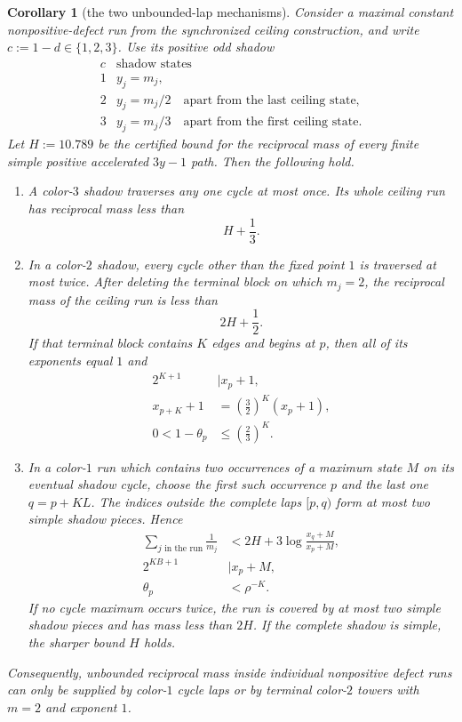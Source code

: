 \documentclass[11pt]{article}
\newtheorem{corollary}[theorem]{Corollary}
\begin{document}
\begin{corollary}[the two unbounded-lap mechanisms]
Consider a maximal constant nonpositive-defect run from the synchronized
ceiling construction, and write $c:=1-d\in\{1,2,3\}$.  Use its positive
odd shadow
\[
\begin{array}{c|c}
  c&\text{shadow states}\ \\ \hline
  1&y_j=m_j,\\
  2&y_j=m_j/2\quad\text{apart from the last ceiling state},\\
  3&y_j=m_j/3\quad\text{apart from the first ceiling state}.
\end{array}
\tag{26}
\]
Let $H:=10.789$ be the certified bound for the reciprocal mass of every
finite simple positive accelerated $3y-1$ path.  Then the following hold.

\begin{enumerate}
  \item A color-$3$ shadow traverses any one cycle at most once.  Its whole
  ceiling run has reciprocal mass less than
  \[
    H+\frac13.
    \tag{27}
  \]

  \item In a color-$2$ shadow, every cycle other than the fixed point $1$
  is traversed at most twice.  After deleting the terminal block on which
  $m_j=2$, the reciprocal mass of the ceiling run is less than
  \[
    2H+\frac12.
    \tag{28}
  \]
  If that terminal block contains $K$ edges and begins at $p$, then all of
  its exponents equal $1$ and
  \[
  \boxed{\begin{aligned}
    2^{K+1}&\mid x_p+1,\\
    x_{p+K}+1&=\left(\frac32\right)^K(x_p+1),\\
    0<1-\theta_p&\leq\left(\frac23\right)^K.
  \end{aligned}}
  \tag{29}
  \]

  \item In a color-$1$ run which contains two occurrences of a maximum
  state $M$ on its eventual shadow cycle, choose the first such occurrence
  $p$ and the last one $q=p+KL$.  The indices outside the complete laps
  $[p,q)$ form at most two simple shadow pieces.  Hence
  \[
  \boxed{\begin{aligned}
    \sum_{j\text{ in the run}}\frac1{m_j}
    &<2H+3\log\frac{x_q+M}{x_p+M},\\
    2^{KB+1}&\mid x_p+M,\\
    \theta_p&<\rho^{-K}.
  \end{aligned}}
  \tag{30}
  \]
  If no cycle maximum occurs twice, the run is covered by at most two simple
  shadow pieces and has mass less than $2H$.  If the complete shadow is
  simple, the sharper bound $H$ holds.
\end{enumerate}

Consequently, unbounded reciprocal mass inside individual nonpositive
defect runs can only be supplied by color-$1$ cycle laps or by terminal
color-$2$ towers with $m=2$ and exponent $1$.
\end{corollary}
\end{document}
